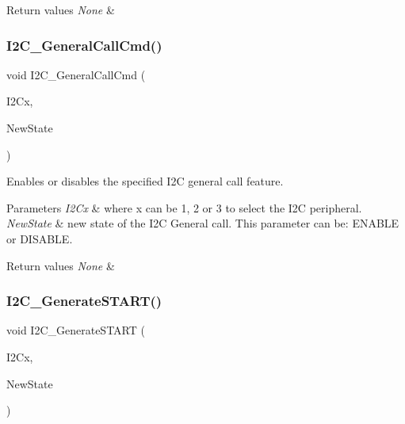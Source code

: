 \begin{DoxyRetVals}{Return values}
{\em None} & \\
\hline
\end{DoxyRetVals}
\mbox{\label{group___i2_c_ga65c740fc8d7b3b9f15cc432d8699d471}} 
\subsubsection{\texorpdfstring{I2\+C\+\_\+\+General\+Call\+Cmd()}{I2C\_GeneralCallCmd()}}
{\footnotesize\ttfamily void I2\+C\+\_\+\+General\+Call\+Cmd (\begin{DoxyParamCaption}\item[{I2\+C\+\_\+\+Type\+Def $\ast$}]{I2\+Cx,  }\item[{Functional\+State}]{New\+State }\end{DoxyParamCaption})}



Enables or disables the specified I2C general call feature. 


\begin{DoxyParams}{Parameters}
{\em I2\+Cx} & where x can be 1, 2 or 3 to select the I2C peripheral. \\
\hline
{\em New\+State} & new state of the I2C General call. This parameter can be\+: E\+N\+A\+B\+LE or D\+I\+S\+A\+B\+LE. \\
\hline
\end{DoxyParams}

\begin{DoxyRetVals}{Return values}
{\em None} & \\
\hline
\end{DoxyRetVals}
\mbox{\label{group___i2_c_ga36c522b471588be9779c878222ccb20f}} 
\subsubsection{\texorpdfstring{I2\+C\+\_\+\+Generate\+S\+T\+A\+R\+T()}{I2C\_GenerateSTART()}}
{\footnotesize\ttfamily void I2\+C\+\_\+\+Generate\+S\+T\+A\+RT (\begin{DoxyParamCaption}\item[{I2\+C\+\_\+\+Type\+Def $\ast$}]{I2\+Cx,  }\item[{Functional\+State}]{New\+State }\end{DoxyParamCaption})}



